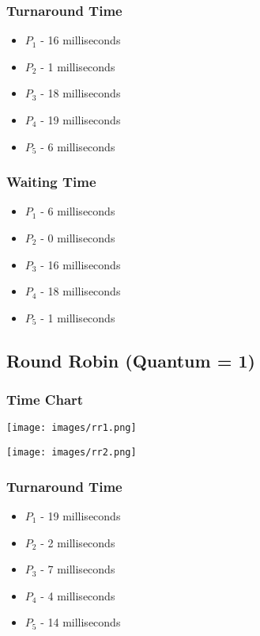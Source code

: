 \documentclass[letterpaper, 10pt,DIV=13]{scrartcl}
\numberwithin{equation}{section} %
\numberwithin{figure}{section} %
\numberwithin{table}{section} %
\begin{document}
\subsubsection{Turnaround Time}
\begin{itemize}
    \item $P_1$ - 16 milliseconds
    \item $P_2$ - 1 milliseconds
    \item $P_3$ - 18 milliseconds 
    \item $P_4$ - 19 milliseconds
    \item $P_5$ - 6 milliseconds
\end{itemize}

\subsubsection{Waiting Time}
\begin{itemize}
    \item $P_1$ - 6 milliseconds
    \item $P_2$ - 0 milliseconds
    \item $P_3$ - 16 milliseconds
    \item $P_4$ - 18 milliseconds
    \item $P_5$ - 1 milliseconds
\end{itemize}

\subsection{Round Robin (Quantum = 1)}
\subsubsection{Time Chart}

\begin{center}\texttt{[image: images/rr1.png]}\end{center}
\begin{center}\texttt{[image: images/rr2.png]}\end{center}

\subsubsection{Turnaround Time}
\begin{itemize}
    \item $P_1$ - 19 milliseconds
    \item $P_2$ - 2 milliseconds
    \item $P_3$ - 7 milliseconds
    \item $P_4$ - 4 milliseconds
    \item $P_5$ - 14 milliseconds
\end{itemize}
\end{document}

